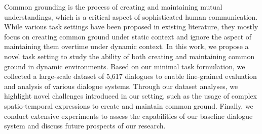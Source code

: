 Common grounding is the process of creating and maintaining mutual understandings, which is a critical aspect of sophisticated human communication. While various task settings have been proposed in existing literature, they mostly focus on creating common ground under static context and ignore the aspect of maintaining them overtime under dynamic context. In this work, we propose a novel task setting to study the ability of both creating and maintaining common ground in dynamic environments. Based on our minimal task formulation, we collected a large-scale dataset of 5,617 dialogues to enable fine-grained evaluation and analysis of various dialogue systems. Through our dataset analyses, we highlight novel challenges introduced in our setting, such as the usage of complex spatio-temporal expressions to create and maintain common ground. Finally, we conduct extensive experiments to assess the capabilities of our baseline dialogue system and discuss future prospects of our research.